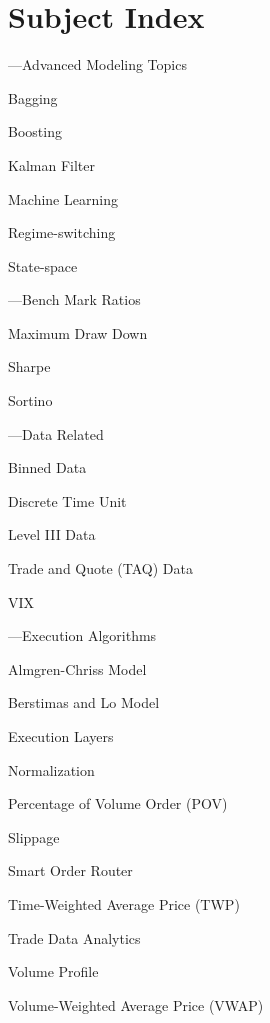 \chapter*{Subject Index}
\nopagebreak
\begin{minipage}{0.40\textwidth}
\noindent ---Advanced Modeling Topics
	\begin{flushright}
	Bagging \par
	Boosting \par
	Kalman Filter \par
	Machine Learning \par
	Regime-switching \par
	State-space 
	\end{flushright}


\noindent ---Bench Mark Ratios
	\begin{flushright}
	Maximum Draw Down \par
	Sharpe \par
	Sortino
	\end{flushright}


\noindent ---Data Related
	\begin{flushright}
	Binned Data \par
	Discrete Time Unit \par
	Level III Data \par
	Trade and Quote (TAQ) Data \par 
	VIX
	\end{flushright}


\noindent ---Execution Algorithms
	\begin{flushright}
	Almgren-Chriss Model \par
	Berstimas and Lo Model \par
	Execution Layers \par
	Normalization \par
	Percentage of Volume Order (POV) \par
	Slippage \par
	Smart Order Router \par
	Time-Weighted Average Price (TWP) \par
	Trade Data Analytics \par
	Volume Profile \par
	Volume-Weighted Average Price (VWAP)
	\end{flushright}
\vfill 
\end{minipage} \hfill
%
